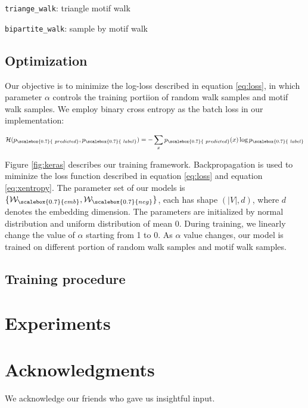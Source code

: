 \documentclass{sig-alternate-05-2015}
\begin{document}
\begin{algorithm}[h] \label{al:mwalk}
\Begin{
==
}
\caption{\texttt{triange\_walk}: triangle motif walk}
\end{algorithm}

\begin{algorithm}[h] \label{al:mbiwalk}
\Begin{
==
}
\caption{\texttt{bipartite\_walk}: sample by motif walk}
\end{algorithm}

\subsection{Optimization}

Our objective is to minimize the log-loss described in 
equation \ref{eq:loss}, in which parameter $\alpha$ 
controls the training portiion of random walk samples
and motif walk samples. We employ binary cross entropy
as the batch loss in our implementation:

\begin{equation} \label{eq:xentropy}
  \mathcal{H}(p_{\scalebox{0.7}{~predicted}}, p_{\scalebox{0.7}{~label}}) 
    = -\sum_{x} p_{\scalebox{0.7}{~predicted}}(x) \log p_{\scalebox{0.7}{~label}}
\end{equation}

Figure \ref{fig:keras} describes our training framework.
Backpropagation is used to miminize the loss function
described in equation \ref{eq:loss} and equation 
\ref{eq:xentropy}. The parameter set of our models is 
$ \{\mathcal{W}_{\scalebox{0.7}{emb}}, \mathcal{W}_{\scalebox{0.7}{neg}} \} $,
each has shape $(|V|, d)$, where $d$ denotes the embedding dimension.
The parameters are initialized by normal distribution
and uniform distribution of mean 0. During training,
we linearly change the value of $\alpha$ starting from 1
to 0. As $\alpha$ value changes, our model is trained
on different portion of random walk samples and motif
walk samples.

\subsection{Training procedure}

\section{Experiments}

\section{Acknowledgments}
We acknowledge our friends who gave us insightful input.


  
\end{document}
